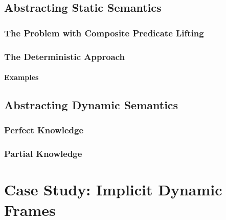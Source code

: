 \section{Abstracting Static Semantics}
\label{sec:abstracting-static-semantics}

    
    \subsection{The Problem with Composite Predicate Lifting}
    \label{ssec:the-problem-with}
    
    
    \subsection{The Deterministic Approach}
    \label{ssec:the-deterministic-approach}
    
    
        \subsubsection{Examples}
        \label{sssec:examples-lift-determ}
        

\section{Abstracting Dynamic Semantics}
\label{sec:abstracting-dynamic-semantics}

    
    \subsection{Perfect Knowledge}
    \label{ssec:perfect-knowledge}
    
    
    \subsection{Partial Knowledge}
    \label{ssec:atomic--knowledge}
    



\chapter{Case Study: Implicit Dynamic Frames}
\label{ch:case-study--implicit}


